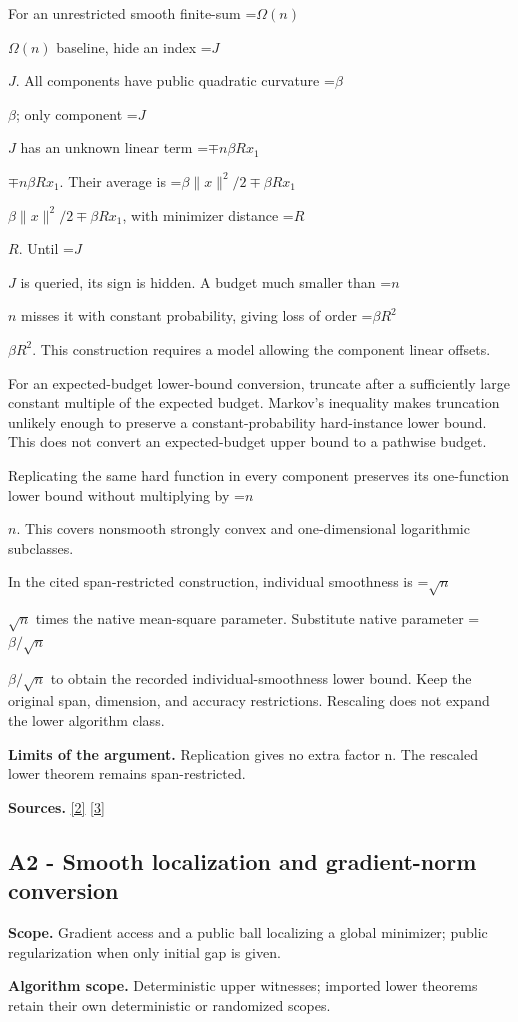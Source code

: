 \documentclass[10pt,a4paper]{article}
\newcommand{\AtlasMath}[1]{\par\begingroup\centering\setbox0=\hbox{$\displaystyle #1$}\ifdim\wd0>1.4\linewidth\typeout{ATLAS WIDE FORMULA: \the\wd0}\fi\ifdim\wd0>\linewidth\resizebox{\linewidth}{!}{\box0}\else\box0\fi\par\endgroup}
\newcommand{\AtlasInlineMath}[1]{\begingroup\setbox0=\hbox{$#1$}\ifdim\wd0>.4\linewidth\endgroup\AtlasMath{#1}\else\endgroup$#1$\fi}
\begin{document}
For an unrestricted smooth finite-sum \AtlasInlineMath{\Omega(n)} baseline, hide an index \AtlasInlineMath{J}. All components have public quadratic curvature \AtlasInlineMath{\beta}; only component \AtlasInlineMath{J} has an unknown linear term \AtlasInlineMath{\mp n\beta R x_1}. Their average is
\AtlasInlineMath{\beta\|x\|^2/2\mp\beta Rx_1}, with minimizer distance \AtlasInlineMath{R}. Until \AtlasInlineMath{J} is queried, its sign is hidden. A budget much smaller than \AtlasInlineMath{n} misses it with constant probability, giving loss of order \AtlasInlineMath{\beta R^2}. This construction requires a model allowing the component linear offsets.

For an expected-budget lower-bound conversion, truncate after a sufficiently large constant multiple of the expected budget. Markov's inequality makes truncation unlikely enough to preserve a constant-probability hard-instance lower bound. This does not convert an expected-budget upper bound to a pathwise budget.

Replicating the same hard function in every component preserves its one-function lower bound without multiplying by \AtlasInlineMath{n}. This covers nonsmooth strongly convex and one-dimensional logarithmic subclasses.

In the cited span-restricted construction, individual smoothness is \AtlasInlineMath{\sqrt n} times the native mean-square parameter. Substitute native parameter \AtlasInlineMath{\beta/\sqrt n} to obtain the recorded individual-smoothness lower bound. Keep the original span, dimension, and accuracy restrictions. Rescaling does not expand the lower algorithm class.

\textbf{Limits of the argument.} Replication gives no extra factor n. The rescaled lower theorem remains span-restricted.

\textbf{Sources.} \href{https://proceedings.mlr.press/v97/zhou19b/zhou19b.pdf}{[2]} \href{https://arxiv.org/pdf/1405.4980}{[3]}

\subsection{A2 - Smooth localization and gradient-norm conversion}
\textbf{Scope.} Gradient access and a public ball localizing a global minimizer; public regularization when only initial gap is given.

\textbf{Algorithm scope.} Deterministic upper witnesses; imported lower theorems retain their own deterministic or randomized scopes.
\end{document}

